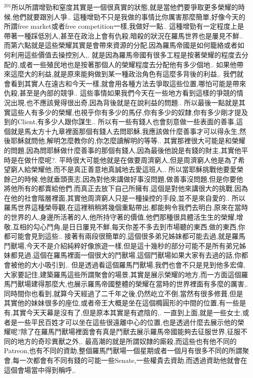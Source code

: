 \documentclass{book}
\begin{document}
$^{201}$所以所謂增勁和窒度其實是一個很真實的狀態,就是當他們要爭取更多榮耀的時候,他們就要跟別人爭..
這種增勁不只是我做的事情比你厲害那麼簡單,好像今天的所謂free market或者free competition一樣,我做好一點..
這種增勁有一定程度上是帶著一種踩低別人,甚至在政治上會有仇殺,暗殺的狀況在羅馬世界也是屢見不鮮..
而第六點就是這些榮耀其實是會帶來資源的分配,因為羅馬帝國是如何籠絡或者如何利用這些價值去操控別人,.
就是因為羅馬帝國有很多工程是按著榮耀的程度去分配的,或者一些殖民地也是按著那個人的榮耀程度去分配他有多少個地..
如果他帶來這麼大的利益,就是原來能夠做到某一種政治角色有這麼多背後的利益,.
我們就會看到其實人在遠古和今天一樣,就會用各種方法去爭取這些位置,哪怕可能是帶來仇殺,甚至是內部的競爭..
這些事情如果我們今天在一些地方看到這樣的爭競的情況出現,也不應該覺得很出奇,因為背後就是在說利益的問題..
所以最後一點就是其實這些人有多少的榮耀,也視乎你有多少的馬仔,你有多少的奴隸,你有多少剛才提及到的Client,有多少人跟你謀生..
所以有一些有錢人也會刻意做一些表面的善事,這個就是馬太方十九章裡面那個有錢人去問耶穌,我應該做什麼善事才可以得永生,然後耶穌就問他,解明怎麼教你的,你怎麼讀解明的等等..
其實那裡很大可能是和榮耀的問題,因為問耶穌做什麼善事的那個有錢人,因為最後他說是有錢的財主,其實他平時是在做什麼呢?.
平時很大可能他就是在做要周濟窮人,但是周濟窮人他是為了希望窮人給榮耀他,而不是真正善意地真誠地去愛這班人..
所以當耶穌挑戰他要愛榮餘己的時候,他就垂頭喪志,因為對他來講做好事沒問題,做善事沒問題,但是你要他將他所有的都賣給他們,而真正去放下自己所擁有,這個是對他來講很大的挑戰,因為在他的社會階層裡面,其實他周濟窮人只是一種操控的手段,並不是來自愛的..
所以羅馬世界這種榮辱觀,在這裡稍稍將幾個重點帶出,都能夠令我們去明白,原來在當時的世界的人,身邊所活著的人,他所持守著的價值,他們那種很具體活生生的榮耀,增敬,互相的勾心鬥角,是日日屢見不鮮,每天你差不多去到市場聽的東西,做的東西,你都可能會見到這些..
接著有兩段很簡單的,這個很多弟兄姊妹都可能去過,就是羅馬鬥獸場,今天不是介紹純粹好像旅遊一樣,但是這十幾秒的部分可能不是所有弟兄姊妹都見過,這個在羅馬裡面一個很大的鬥獸場,這個鬥獸場如果大家有去過的話,你都會被他的大小吸引到,.
但是透過看這個羅馬鬥獸場,我們也會不只是見到他多宏偉,大家要記住,建築羅馬這些所謂聚會的場景,其實是展示榮耀的地方,而一方面這個羅馬鬥獸場建得那麼大,也展示羅馬帝國整體的榮耀在當時的世界裡面有多麼的厲害,.
同時間你也看到,就算今天經過了二千年之後,仍然屹立不倒,當然有很多修葺,但是其實他的妹妹很多的座位,或者帝王大概是坐在這個橢圓形的中間的位置,有一些是有,其實今天天幕是沒有了,但是原本其實是有遮陰的,.
一直到上面,就是一些女士,或者是一些平民百姓才可以坐在這些很遠離中心的位置,也是透過什麼去展示他的榮耀呢?除了在羅馬鬥獸場裡面會有真是鬥獸去展示羅馬帝國能夠去征服世界,征服不同的地方的奇珍異獸之外,.
最高潮的就是所謂奴隸的廝殺,而這些也有他不同的Patreon,也有不同的資助,整個羅馬鬥獸場一個星期或者一個月有很多不同的所謂聚會,每一次都會有不同有錢的可能一些Senate,一些權貴去資助,而透過資助他就會在這個會場當中得到稱呼,.
\end{document}
